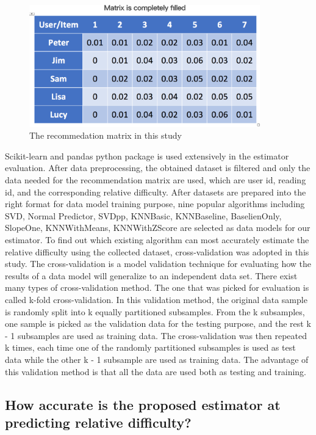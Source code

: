 \begin{figure}[tbp]
 \begin{center}
  \includegraphics[width=100mm]{matrix_full.eps}
 \end{center}
 \caption{\label{figure:matrix_full} The recommedation matrix in this study}
\end{figure}

Scikit-learn and pandas python package is used extensively in the estimator evaluation. After data preprocessing, the obtained dataset is filtered and only the data needed for the recommendation matrix are used, which are user id, reading id, and the corresponding relative difficulty. After datasets are prepared into the right format for data model training purpose, nine popular algorithms including SVD, Normal Predictor, SVDpp, KNNBasic, KNNBaseline, BaselienOnly, SlopeOne, KNNWithMeans, KNNWithZScore are selected as data models for our estimator. To find out which existing algorithm can most accurately estimate the relative difficulty using the collected dataset, cross-validation was adopted in this study. The cross-validation is a model validation technique for evaluating how the results of a data model will generalize to an independent data set. There exist many types of cross-validation method. The one that was picked for evaluation is called k-fold cross-validation. In this validation method, the original data sample is randomly split into k equally partitioned subsamples. From the k subsamples, one sample is picked as the validation data for the testing purpose, and the rest k - 1 subsamples are used as training data. The cross-validation was then repeated k times, each time one of the randomly partitioned subsamples is used as test data while the other k - 1 subsample are used as training data. The advantage of this validation method is that all the data are used both as testing and training. 

\subsection{How accurate is the proposed estimator at predicting relative difficulty?}

